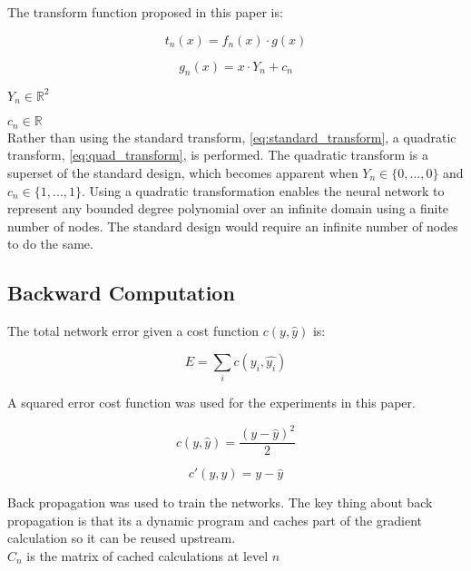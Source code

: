 \documentclass{article}
\begin{document}
The transform function proposed in this paper is:

\begin{equation} \label{eq:quad_transform}
t_n(x) =  f_n(x) \cdot g(x)
\end{equation}

\begin{equation} \label{eq:g}
g_n(x) = x \cdot Y_n + c_n
\end{equation}

$Y_n \in \mathbb{R}^2$

$c_n \in \mathbb{R}$\\

Rather than using the standard transform, \eqref{eq:standard_transform}, a quadratic transform, \eqref{eq:quad_transform}, is performed. The quadratic transform is a superset of the standard design, which becomes apparent when $Y_n \in \{0,...,0\}$ and $c_n \in \{1, ..., 1\}$. Using a quadratic transformation enables the neural network to represent any bounded degree polynomial over an infinite domain using a finite number of nodes. The standard design would require an infinite number of nodes to do the same.

\subsection{Backward Computation}

The total network error given a cost function $c(y, \hat{y})$ is:

\begin{equation} \label{eq:total_error}
E = \sum_i c(y_i, \hat{y_i})
\end{equation}

A squared error cost function was used for the experiments in this paper.

\begin{equation} \label{eq:squared_cost}
c(y, \hat{y}) = \frac{(y - \hat{y})^2}{2}
\end{equation}

\begin{equation} \label{eq:squared_cost_prime}
c'(y, \hat{y}) = y - \hat{y}
\end{equation}

Back propagation was used to train the networks. The key thing about back propagation is that its a dynamic program and caches part of the gradient calculation so it can be reused upstream.\\

$C_n$ is the matrix of cached calculations at level $n$\\
\end{document}
